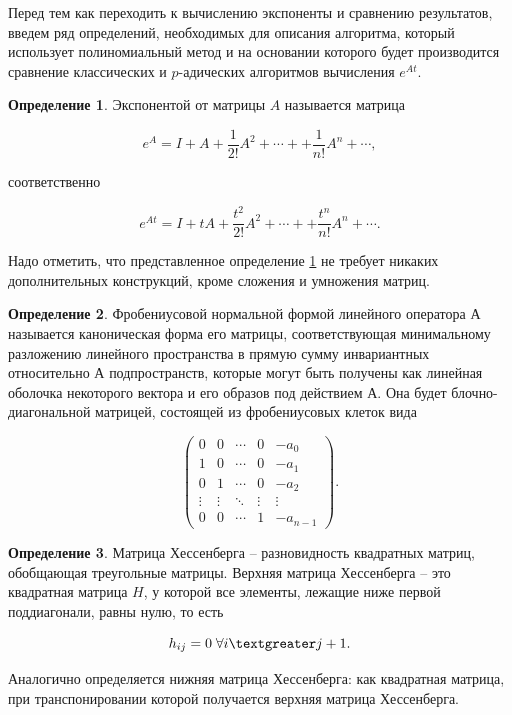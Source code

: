\documentclass[master, och, times, pract]{sty/SCWorks}
\theoremstyle{plain}
\theoremstyle{definition}
\newtheorem{defn}{Определение}[section]
\numberwithin{equation}{section}
\begin{document}
Перед тем как переходить к вычислению экспоненты и сравнению результатов, введем ряд определений, необходимых для описания алгоритма, который использует полиномиальный метод и на основании которого будет производится сравнение классических и $p$-адических алгоритмов вычисления $e^{At}$.

\begin{defn}\label{def:exp}
Экспонентой от матрицы $A$ называется матрица

\begin{equation}
e^A=I+A+\frac{1}{2!}A^2+\cdots++\frac{1}{n!}A^n + \cdots,
\end{equation}

\noindent соответственно

\begin{equation}
e^{At}=I+tA+\frac{t^2}{2!}A^2+\cdots++\frac{t^n}{n!}A^n + \cdots.
\end{equation}
\end{defn}

Надо отметить, что представленное определение \ref{def:exp} не требует никаких дополнительных конструкций, кроме сложения и умножения матриц.

\begin{defn}
Фробениусовой нормальной формой линейного оператора $А$ называется каноническая форма его матрицы, соответствующая минимальному разложению линейного пространства в прямую сумму инвариантных относительно $А$ подпространств, которые могут быть получены как линейная оболочка некоторого вектора и его образов под действием $А$. Она будет блочно-диагональной матрицей, состоящей из фробениусовых клеток вида

\begin{equation}
\begin{pmatrix}
0&0&\cdots&0&-a_0\\
1&0&\cdots&0&-a_1\\
0&1&\cdots&0&-a_2\\
\vdots&\vdots&\ddots&\vdots&\vdots\\
0&0&\cdots&1&-a_{n-1}
\end{pmatrix}.
\end{equation}

\end{defn}

\begin{defn}
Матрица Хессенберга -- разновидность квадратных матриц, обобщающая треугольные матрицы. Верхняя матрица Хессенберга -- это квадратная матрица ${\displaystyle H}$, у которой все элементы, лежащие ниже первой поддиагонали, равны нулю, то есть

\begin{equation}
h_{ij}=0 \; \forall i \textgreater j+1.
\end{equation}

\noindent Аналогично определяется нижняя матрица Хессенберга: как квадратная матрица, при транспонировании которой получается верхняя матрица Хессенберга\cite{bib:ode:1}.
\end{defn}
\end{document}
